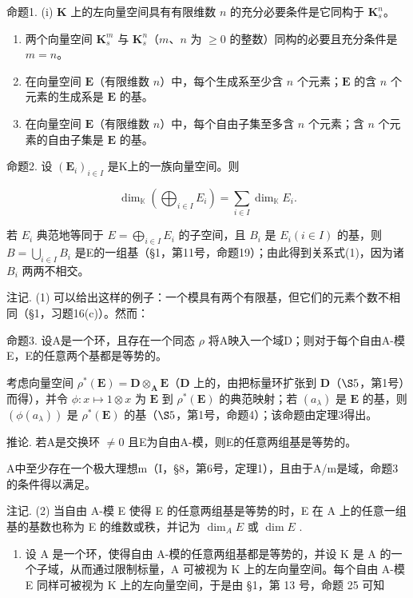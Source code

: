 命题1. (i) \(\mathbf{K}\) 上的左向量空间具有有限维数 \(n\) 的充分必要条件是它同构于 \(\mathbf{K}_s^n\)。

\begin{enumerate}
\def\labelenumi{(\roman{enumi})}
\setcounter{enumi}{1}
\item
  两个向量空间 \(\mathbf{K}_s^m\) 与 \(\mathbf{K}_s^n\)（\(m\)、\(n\) 为 \(\geqslant 0\) 的整数）同构的必要且充分条件是 \(m = n\)。
\item
  在向量空间 \(\mathbf{E}\)（有限维数 \(n\)）中，每个生成系至少含 \(n\) 个元素；\(\mathbf{E}\) 的含 \(n\) 个元素的生成系是 \(\mathbf{E}\) 的基。
\item
  在向量空间 \(\mathbf{E}\)（有限维数 \(n\)）中，每个自由子集至多含 \(n\) 个元素；含 \(n\) 个元素的自由子集是 \(\mathbf{E}\) 的基。
\end{enumerate}

命题2. 设 \((\mathbf{E}_i)_{i\in I}\) 是K上的一族向量空间。则

\[
\dim_ {\mathbb {K}} \left(\bigoplus_ {i \in I} E _ {i}\right) = \sum_ {i \in I} \dim_ {\mathbb {K}} E _ {i}.\tag{1}
\]

若 \(E_{i}\) 典范地等同于 \(E = \bigoplus_{i \in I} E_{i}\) 的子空间，且 \(B_{i}\) 是 \(E_{i} (i \in I)\) 的基，则 \(B = \bigcup_{i \in I} B_{i}\) 是E的一组基（§1，第11号，命题19）；由此得到关系式(1)，因为诸 \(B_{i}\) 两两不相交。

注记. (1) 可以给出这样的例子：一个模具有两个有限基，但它们的元素个数不相同（§1，习题16(c)）。然而：

命题3. 设A是一个环，且存在一个同态 \(\rho\) 将A映入一个域D；则对于每个自由A-模E，E的任意两个基都是等势的。

考虑向量空间 \(\rho^{*}(\mathbf{E}) = \mathbf{D} \otimes_{\mathbf{A}} \mathbf{E}\)（\(\mathbf{D}\) 上的，由把标量环扩张到 \(\mathbf{D}\)（\(\S 5\)，第1号）而得），并令 \(\phi: x \mapsto 1 \otimes x\) 为 \(\mathbf{E}\) 到 \(\rho^{*}(\mathbf{E})\) 的典范映射；若 \((a_{\lambda})\) 是 \(\mathbf{E}\) 的基，则 \((\phi(a_{\lambda}))\) 是 \(\rho^{*}(\mathbf{E})\) 的基（\(\S 5\)，第1号，命题4）；该命题由定理3得出。

推论. 若A是交换环 \(\neq0\) 且E为自由A-模，则E的任意两组基是等势的。

A中至少存在一个极大理想m（I，§8，第6号，定理1），且由于A/m是域，命题3的条件得以满足。

注记. (2) 当自由 A-模 E 使得 E 的任意两组基是等势的时，E 在 A 上的任意一组基的基数也称为 E 的维数或秩，并记为 \(\dim_{A}E\) 或 \(\dim E\) .

\begin{enumerate}
\def\labelenumi{(\arabic{enumi})}
\setcounter{enumi}{2}
\tightlist
\item
  设 A 是一个环，使得自由 A-模的任意两组基都是等势的，并设 K 是 A 的一个子域，从而通过限制标量，A 可被视为 K 上的左向量空间。每个自由 A-模 E 同样可被视为 K 上的左向量空间，于是由 §1，第 13 号，命题 25 可知
\end{enumerate}

